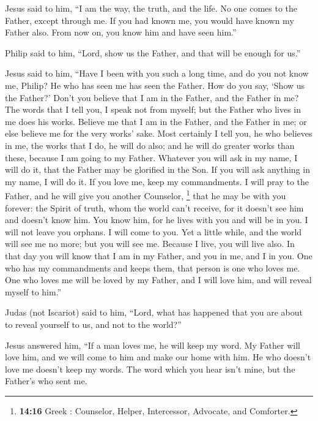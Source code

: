  Jesus said to him, ``I am the way, the truth, and the
life. No one comes to the Father, except through me.  If
you had known me, you would have known my Father also. From now on, you
know him and have seen him.''

 Philip said to him, ``Lord, show us the Father, and that
will be enough for us.''

 Jesus said to him, ``Have I been with you such a long
time, and do you not know me, Philip? He who has seen me has seen the
Father. How do you say, `Show us the Father?'  Don't you
believe that I am in the Father, and the Father in me? The words that I
tell you, I speak not from myself; but the Father who lives in me does
his works.  Believe me that I am in the Father, and the
Father in me; or else believe me for the very works' sake.
 Most certainly I tell you, he who believes in me, the
works that I do, he will do also; and he will do greater works than
these, because I am going to my Father.  Whatever you
will ask in my name, I will do it, that the Father may be glorified in
the Son.  If you will ask anything in my name, I will do
it.  If you love me, keep my commandments.
 I will pray to the Father, and he will give you another
Counselor, \footnote{\textbf{14:16} Greek : Counselor,
  Helper, Intercessor, Advocate, and Comforter.} that he may be with you
forever:  the Spirit of truth, whom the world can't
receive, for it doesn't see him and doesn't know him. You know him, for
he lives with you and will be in you.  I will not leave
you orphans. I will come to you.  Yet a little while, and
the world will see me no more; but you will see me. Because I live, you
will live also.  In that day you will know that I am in
my Father, and you in me, and I in you.  One who has my
commandments and keeps them, that person is one who loves me. One who
loves me will be loved by my Father, and I will love him, and will
reveal myself to him.''

 Judas (not Iscariot) said to him, ``Lord, what has
happened that you are about to reveal yourself to us, and not to the
world?''

 Jesus answered him, ``If a man loves me, he will keep my
word. My Father will love him, and we will come to him and make our home
with him.  He who doesn't love me doesn't keep my words.
The word which you hear isn't mine, but the Father's who sent me.

